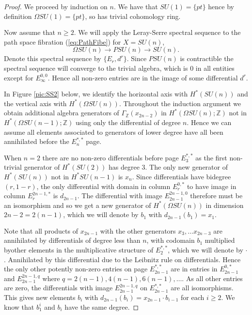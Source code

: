 \documentclass{article}
\theoremstyle{plain}
\theoremstyle{definition}
\numberwithin{thm}{section}
\begin{document}
		\begin{proof}
			We proceed by induction on $n$.
			We have that $SU(1) = \{ pt \}$ hence by definition $\Omega SU(1) = \{ pt \}$, so has trivial cohomology ring.
			
			Now assume that $n \geq 2$. 
			We will apply the Leray-Serre spectral sequence to the path space fibration (\ref{eq:PathFibe}) for $X=SU(n)$,
			\begin{equation*}
				\Omega SU(n) \to PSU(n) \to SU(n).
			\end{equation*}
			Denote this spectral sequence by $\{ E_r,d^r \}$.
			Since $PSU(n)$ is contractible the spectral sequence will converge to the trivial algebra,
			which is $0$ in all entities except for $E_{\infty}^{0,0}$.
			Hence all non-zero entries are in the image of some differential $d^r$.
			
			In Figure \ref{pic:SS2} below, we identify the horizontal axis with $H^{*}(SU(n))$ and the vertical axis with $H^{*}(\Omega SU(n))$.
			Throughout the induction argument we obtain additional algebra generators of ${\Gamma}_{\mathbb{Z}}(x_{2n-2})$ in $H^{*}(\Omega SU(n);\mathbb{Z})$ not in 
			$H^{*}(\Omega SU(n-1);\mathbb{Z})$ using only the differential of degree $n$. 
			Hence we can assume all elements associated to generators of lower degree have all been annihilated before the $E^{*,*}_{n}$ page.
			
			When $n=2$ there are no non-zero differentials before page $E^{*,*}_{3}$ as the first non-trivial generator of $H^{*}(SU(2))$ has degree $3$.
			The only new generator of $H^{*}(SU(n))$ not in $H^{*}SU(n-1)$ is $x_{n}$.
			Since differentials have bidegree $(r,1-r)$, the only differential with domain in column $E^{0,*}_{r}$ to have image in column $E^{2n-1,*}_{r}$ is $d_{2n-1}$.
			The differential with image $E^{2n-1,0}_{2n-1}$ therefore must be an isomorphism and so we get a new generator of $H^{*}(\Omega SU(n))$
			in dimension $2n-2=2(n-1)$, which we will denote by $b_{1}$ with $d_{2n-1}(b_{1})=x_{1}$.
			
			Note that all products of $x_{2n-1}$ with the other generators $x_{3}, \dots x_{2n-3}$ are annihilated by differentials of degree less than $n$,
			with codomain $b_{1}$ multiplied byother elements in the multiplicative structure of $E_{2}^{*,*}$, which we will denote by $\cdot$.
			Annihilated by this differential due to the Leibnitz rule on differentials.
			Hence the only other potently non-zero entries on page $E_{2n-1}^{*,*}$ are in entries in $E_{2n-1}^{0,*}$
			and $E_{2n-1}^{2n-1,q}$ where $q= 2(n-1), 4(n-1), 6(n-1), \dots$.
			As all other entries are zero, the differentials with image $E_{2n-1}^{2n-1,q}$ on $E_{2n-1}^{*,*}$ are all isomorphisms.
			This gives new elements $b_{i}$ with $d_{2n-1}(b_{i})=x_{2n-1} \cdot b_{i-1}$ for each $i \geq 2$.
			We know that $b_{1}^{i}$ and $b_{i}$ have the same degree.
			

\end{proof}
\end{document}
